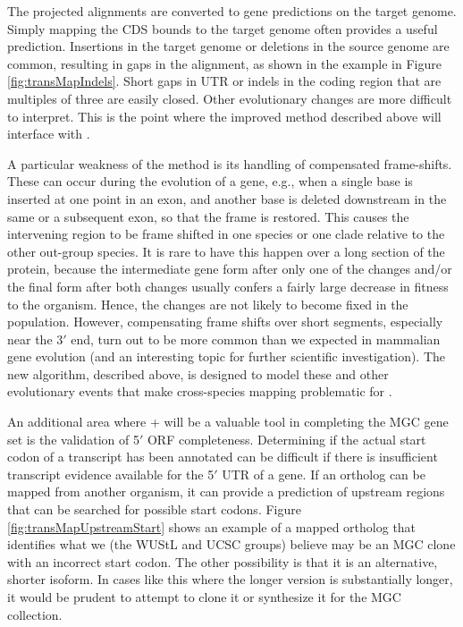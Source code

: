 The projected alignments are converted to gene predictions on the
target genome.  Simply mapping the CDS bounds to the target genome
often provides a useful prediction.  Insertions in the target genome
or deletions in the source genome are common, resulting in gaps in
the alignment, as shown in the example in Figure
\ref{fig:transMapIndels}.  Short gaps in UTR or indels in the coding
region that are multiples of three are easily closed. Other
evolutionary changes are more difficult to interpret. This is the
point where the improved \Ex method described above will interface
with \TransMap.

A particular weakness of the \TransMap method is its handling of
compensated frame-shifts. These can occur during the evolution of a
gene, e.g., when a single base is inserted at one point in an exon,
and another base is deleted downstream in the same or a subsequent
exon, so that the frame is restored. This causes the intervening
region to be frame shifted in one species or one clade relative to
the other out-group species.  It is rare to have this happen over a
long section of the protein, because the intermediate gene form
after only one of the changes and/or the final form after both
changes usually confers a fairly large decrease in fitness to the
organism. Hence, the changes are not likely to become fixed in the
population. However, compensating frame shifts over short segments,
especially near the 3$'$ end, turn out to be more common than we
expected in mammalian gene evolution (and an interesting topic for
further scientific investigation). The new \Ex algorithm, described
above, is designed to model these and other evolutionary events that
make cross-species mapping problematic for \TransMap.


An additional area where \TransMap + \Ex will be a valuable tool in
completing the MGC gene set is the validation of 5$'$ ORF
completeness.  Determining if the actual start codon of a transcript
has been annotated can be difficult if there is insufficient
transcript evidence available for the 5$'$ UTR of a gene. If an
ortholog can be mapped from another organism, it can provide a
prediction of upstream regions that can be searched for possible
start codons. Figure \ref{fig:transMapUpstreamStart} shows an
example of a mapped ortholog that identifies what we (the WUStL and
UCSC groups) believe may be an MGC clone with an incorrect start
codon. The other possibility is that it is an alternative, shorter
isoform. In cases like this where the longer version is
substantially longer, it would be prudent to attempt to clone it or
synthesize it for the MGC collection.

